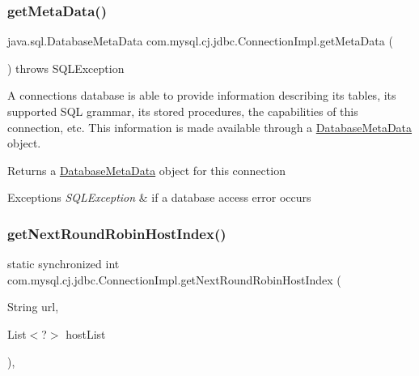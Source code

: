 \subsubsection{\texorpdfstring{get\+Meta\+Data()}{getMetaData()}}
{\footnotesize\ttfamily java.\+sql.\+Database\+Meta\+Data com.\+mysql.\+cj.\+jdbc.\+Connection\+Impl.\+get\+Meta\+Data (\begin{DoxyParamCaption}{ }\end{DoxyParamCaption}) throws S\+Q\+L\+Exception}

A connection\textquotesingle{}s database is able to provide information describing its tables, its supported S\+QL grammar, its stored procedures, the capabilities of this connection, etc. This information is made available through a \mbox{\hyperlink{classcom_1_1mysql_1_1cj_1_1jdbc_1_1_database_meta_data}{Database\+Meta\+Data}} object.

\begin{DoxyReturn}{Returns}
a \mbox{\hyperlink{classcom_1_1mysql_1_1cj_1_1jdbc_1_1_database_meta_data}{Database\+Meta\+Data}} object for this connection 
\end{DoxyReturn}

\begin{DoxyExceptions}{Exceptions}
{\em S\+Q\+L\+Exception} & if a database access error occurs \\
\hline
\end{DoxyExceptions}
\mbox{\label{classcom_1_1mysql_1_1cj_1_1jdbc_1_1_connection_impl_afffa26efb98bd5458d9731aa79da4b27}} 
\subsubsection{\texorpdfstring{get\+Next\+Round\+Robin\+Host\+Index()}{getNextRoundRobinHostIndex()}}
{\footnotesize\ttfamily static synchronized int com.\+mysql.\+cj.\+jdbc.\+Connection\+Impl.\+get\+Next\+Round\+Robin\+Host\+Index (\begin{DoxyParamCaption}\item[{String}]{url,  }\item[{List$<$?$>$}]{host\+List }\end{DoxyParamCaption})\hspace{0.3cm}{\ttfamily [static]}, {\ttfamily [protected]}}


